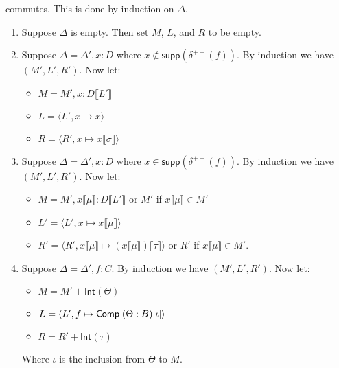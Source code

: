 \documentclass[draft]{article}
\newcommand*{\Comp}[3]{\ensuremath\mathsf{Comp}\;(#1:#2)[#3]}
\newcommand*{\sub}[2]{\ensuremath{#1\llbracket #2 \rrbracket}}
\newcommand*{\supp}{\ensuremath{\mathsf{supp}}}
\newcommand*{\Int}{\ensuremath{\mathsf{Int}}}
\begin{document}
commutes. This is done by induction on \(\Delta\).
\begin{enumerate}
\item Suppose \(\Delta\) is empty. Then set \(M\), \(L\), and \(R\) to be empty.
\item Suppose \(\Delta = \Delta' , x : D\) where \(x \not\in \supp(\delta^{+-}(f))\). By induction we have \((M',L',R')\). Now let:
  \begin{itemize}
  \item \(M = M' , x : \sub D {L'}\)
  \item \(L = \langle L' , x \mapsto x \rangle\)
  \item \(R = \langle R' , x \mapsto \sub x \sigma \rangle\)
  \end{itemize}
\item Suppose \(\Delta = \Delta' , x : D\) where \(x \in \supp(\delta^{+-}(f))\). By induction we have \((M',L',R')\). Now let:
  \begin{itemize}
  \item \(M = M' , \sub x \mu : \sub D {L'}\) or \(M'\) if \(\sub x \mu \in M'\)
  \item \(L' = \langle L' , x \mapsto \sub x \mu \rangle\)
  \item \(R' = \langle R' , \sub x \mu \mapsto \sub {(\sub x \mu)} \tau \rangle\) or \(R'\) if \(\sub x \mu \in M'\).
  \end{itemize}
\item Suppose \(\Delta = \Delta' , f : C\). By induction we have \((M',L',R')\). Now let:
  \begin{itemize}
  \item \(M = M' + \Int(\Theta)\)
  \item \(L = \langle L', f \mapsto \Comp \Theta B \iota \rangle\)
  \item \(R = R' + \Int(\tau)\)
  \end{itemize}
  Where \(\iota\) is the inclusion from \(\Theta\) to \(M\).
\end{enumerate}
\end{document}
